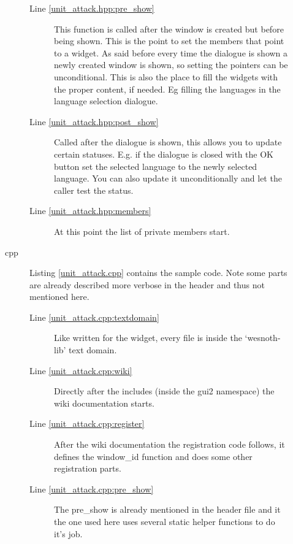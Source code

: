 \begin{description}
\begin{description}
\begin{description}
	\item[Line \ref{unit_attack.hpp:pre_show}]
		This function is called after the window is created but before being
shown. This is the point to set the members that point to a widget. As said
before every time the dialogue is shown a newly created window is shown, so
setting the pointers can be unconditional. This is also the place to fill the
widgets with the proper content, if needed. Eg filling the languages in the
language selection dialogue.

	\item[Line \ref{unit_attack.hpp:post_show}]
		Called after the dialogue is shown, this allows you to update certain
statuses. E.g. if the dialogue is closed with the OK button set the selected
language to the newly selected language. You can also update it unconditionally
and let the caller test the status.

	\item[Line \ref{unit_attack.hpp:members}]
		At this point the list of private members start.

	\end{description}

\item[cpp] Listing \ref{unit_attack.cpp} contains the sample code. Note some
parts are already described more verbose in the header and thus not mentioned
here.
	\begin{description}
	\item[Line \ref{unit_attack.cpp:textdomain}]
		Like written for the widget, every file is inside the `wesnoth-lib' text
domain.

	\item[Line \ref{unit_attack.cpp:wiki}]
		Directly after the includes (inside the gui2 namespace) the wiki
documentation starts.


	\item[Line \ref{unit_attack.cpp:register}]
		After the wiki documentation the registration code follows, it defines
the window\_id function and does some other registration parts.

	\item[Line \ref{unit_attack.cpp:pre_show}]
		The pre\_show is already mentioned in the header file and it the one
used here uses several static helper functions to do it's job.

	\end{description}

\end{description}


\end{description}
